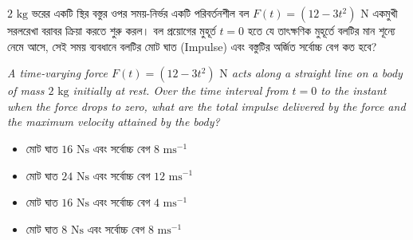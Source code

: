 \documentclass[12pt, a4paper]{article}
\begin{document}
{{\newpage

\begin{tcolorbox}[questionbox={প্রশ্ন (Question) 50}]
    \noindent
    $2\text{ kg}$ ভরের একটি স্থির বস্তুর ওপর সময়-নির্ভর একটি পরিবর্তনশীল বল $F(t) = (12 - 3t^2)\text{ N}$ একমুখী সরলরেখা বরাবর ক্রিয়া করতে শুরু করল। বল প্রয়োগের মুহূর্ত $t = 0$ হতে যে তাৎক্ষণিক মুহূর্তে বলটির মান শূন্যে নেমে আসে, সেই সময় ব্যবধানে বলটির মোট ঘাত (Impulse) এবং বস্তুটির অর্জিত সর্বোচ্চ বেগ কত হবে?
    
    \vspace{0.8em}
    \begin{english}
    \noindent\textit{\color{darkgray}
    A time-varying force $F(t) = (12 - 3t^2)\text{ N}$ acts along a straight line on a body of mass $2\text{ kg}$ initially at rest. Over the time interval from $t = 0$ to the instant when the force drops to zero, what are the total impulse delivered by the force and the maximum velocity attained by the body?
    }
    \end{english}
\end{tcolorbox}

\vspace{1em}
\begin{center}
\end{center}
\vspace{1em}

\begin{itemize}[label={}, leftmargin=1cm, itemsep=0.5em]
    \item[\textbf{A)}] মোট ঘাত $16\text{ Ns}$ এবং সর্বোচ্চ বেগ $8\text{ ms}^{-1}$
    \item[\textbf{B)}] মোট ঘাত $24\text{ Ns}$ এবং সর্বোচ্চ বেগ $12\text{ ms}^{-1}$
    \item[\textbf{C)}] মোট ঘাত $16\text{ Ns}$ এবং সর্বোচ্চ বেগ $4\text{ ms}^{-1}$
    \item[\textbf{D)}] মোট ঘাত $8\text{ Ns}$ এবং সর্বোচ্চ বেগ $8\text{ ms}^{-1}$
\end{itemize}

}}
\end{document}

